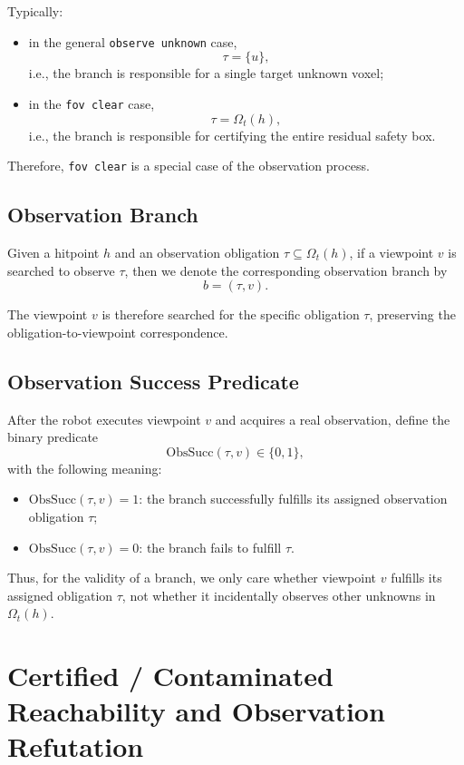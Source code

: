 \documentclass[11pt]{article}
\begin{document}
Typically:
\begin{itemize}[leftmargin=2em]
    \item in the general \texttt{observe unknown} case,
    \[
    \tau=\{u\},
    \]
    i.e., the branch is responsible for a single target unknown voxel;
    \item in the \texttt{fov clear} case,
    \[
    \tau=\Omega_t(h),
    \]
    i.e., the branch is responsible for certifying the entire residual safety box.
\end{itemize}

Therefore, \texttt{fov clear} is a special case of the observation process.

\subsection{Observation Branch}

Given a hitpoint $h$ and an observation obligation $\tau\subseteq \Omega_t(h)$, if a viewpoint $v$ is searched to observe $\tau$, then we denote the corresponding observation branch by
\[
b=(\tau,v).
\]

The viewpoint $v$ is therefore searched for the specific obligation $\tau$, preserving the obligation-to-viewpoint correspondence.

\subsection{Observation Success Predicate}

After the robot executes viewpoint $v$ and acquires a real observation, define the binary predicate
\[
\mathrm{ObsSucc}(\tau,v)\in\{0,1\},
\]
with the following meaning:
\begin{itemize}[leftmargin=2em]
    \item $\mathrm{ObsSucc}(\tau,v)=1$: the branch successfully fulfills its assigned observation obligation $\tau$;
    \item $\mathrm{ObsSucc}(\tau,v)=0$: the branch fails to fulfill $\tau$.
\end{itemize}

Thus, for the validity of a branch, we only care whether viewpoint $v$ fulfills its assigned obligation $\tau$, not whether it incidentally observes other unknowns in $\Omega_t(h)$.

\section{Certified / Contaminated Reachability and Observation Refutation}
\end{document}
